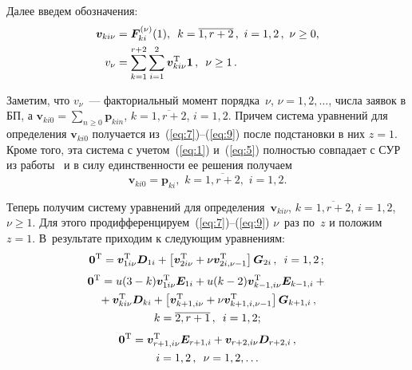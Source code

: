 \begin{multicols}{2}
Далее введем обозначения:
\begin{align}
\label{eq:10}
 \boldsymbol{v}_{ki\nu}&=\boldsymbol{F}_{ki}^{(\nu)}(1),\,\ 
k=\overline{1,r+2}\,, \ i=1,2\,,\ \nu\geq 0,\\
v_{\nu}&=\sum\limits_{k=1}^{r+2}\sum\limits_{i=1}^2 \boldsymbol{v}_{ki\nu}^{\mathrm{T}} \boldsymbol{1}\,, \enskip \nu\geq 1\,.
\label{dd}
\end{align}

Заметим, что $v_{\nu}$~--- факториальный момент  порядка~$\nu$, $\nu=1,2,\ldots$, числа заявок в БП, 
а $\boldsymbol{v}_{ki0}=\sum\limits_{n\geq 0}\boldsymbol{p}_{kin}$, $k=\overline{1,r+2}$, $i=1,2$. 
Причем система уравнений для определения $\boldsymbol{v}_{ki0}$ получается из~(\ref{eq:7})--(\ref{eq:9}) 
после подстановки в них $z=1$. Кроме того, эта система с учетом~(\ref{eq:1})
 и~(\ref{eq:5}) полностью совпадает с СУР из работы~\cite{2mat} и в силу единственности ее решения получаем
\begin{equation*}
\boldsymbol{v}_{ki0}=\boldsymbol{p}_{ki},\,\, k=\overline{1,r+2}, \,\, i=1,2.
\end{equation*}


Теперь получим систему уравнений для определения~$\boldsymbol{v}_{ki\nu}$, $k=\overline{1,r+2}$, $i=1,2$, $\nu\geq 1$. 
Для этого продифференцируем~(\ref{eq:7})--(\ref{eq:9}) $\nu$~раз по~$z$ и положим $z=1$. 
В~результате приходим к следующим уравнениям:
\begin{equation}
\!\!\boldsymbol{0}^{\mathrm{T}}=\boldsymbol{v}_{1i\nu}^{\mathrm{T}}\boldsymbol{D}_{1i}+
\left[\boldsymbol{v}_{2i\nu}^{\mathrm{T}}+\nu\boldsymbol{v}_{2i,\nu-1}^{\mathrm{T}}\right]
\boldsymbol{G}_{2i}\,,\enskip i=1,2\,;\!
\label{eq:12}
\end{equation}
\begin{multline}
\label{eq:13}
\boldsymbol{0}^{\mathrm{T}}=u(3-k)\boldsymbol{v}_{1i\nu}^{\mathrm{T}}\boldsymbol{E}_{1i}+
u(k-2)\boldsymbol{v}_{k-1,i\nu}^{\mathrm{T}}\boldsymbol{E}_{k-1,i}+{}\\
{}+\boldsymbol{v}_{ki\nu}^{\mathrm{T}}\boldsymbol{D}_{ki}
+\left[\boldsymbol{v}_{k+1,i\nu}^{\mathrm{T}}+\nu\boldsymbol{v}_{k+1,i,\nu-1}^{\mathrm{T}}\right]
\boldsymbol{G}_{k+1,i}\,,\\
 k=\overline{2,r+1}\,,\enskip i=1,2;
\end{multline}
\begin{multline}
\label{eq:14}
\boldsymbol{0}^{\mathrm{T}}=\boldsymbol{v}_{r+1,i\nu}^{\mathrm{T}}\boldsymbol{E}_{r+1,i}+
\boldsymbol{v}_{r+2,i\nu}\boldsymbol{D}_{r+2,i}\,,\\
i=1,2\,,\enskip \nu=1,2,\ldots
\end{multline}


\end{multicols}
